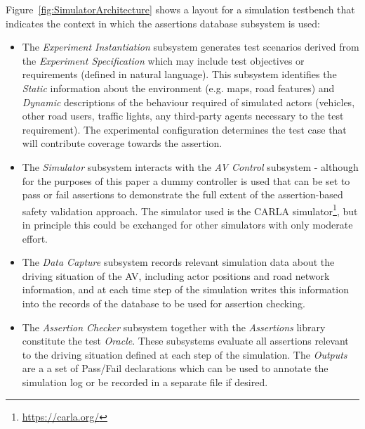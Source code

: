   Figure~\ref{fig:SimulatorArchitecture} shows a layout for a simulation testbench that indicates the context in which the assertions database subsystem is used:

  \begin{itemize}
      \item The \emph{Experiment Instantiation} subsystem generates test scenarios derived from the \emph{Experiment Specification} which may include test objectives or requirements (defined in natural language). This subsystem identifies the \emph{Static} information about the environment (e.g. maps, road features) and \emph{Dynamic} descriptions of the behaviour required of simulated actors (vehicles, other road users, traffic lights, any third-party agents necessary to the test requirement). 
      The experimental configuration determines the test case that will contribute coverage towards the assertion.
      \item The \emph{Simulator} subsystem interacts with the \emph{AV Control} subsystem - although for the purposes of this paper a dummy controller is used that can be set to pass or fail assertions to demonstrate the full extent of the assertion-based safety validation approach. The simulator used is the CARLA simulator\footnote{\url{https://carla.org/}}, but in principle this could be exchanged for other simulators with only moderate effort.
      \item The \emph{Data Capture} subsystem records relevant simulation data about the driving situation of the AV, including actor positions and road network information, and at each time step of the simulation writes this information into the records of the database to be used for assertion checking.
      \item The \emph{Assertion Checker} subsystem together with the \emph{Assertions} library constitute the test \emph{Oracle}. These subsystems evaluate all assertions relevant to the driving situation defined at each step of the simulation. The \emph{Outputs} are a a set of Pass/Fail declarations which can be used to annotate the simulation log or be recorded in a separate file if desired.
  \end{itemize}
